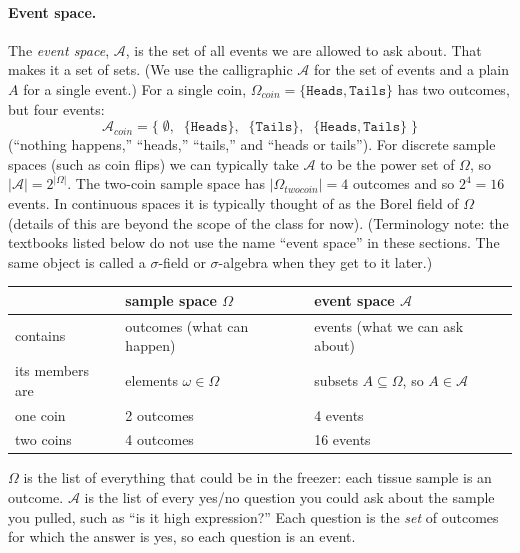 \paragraph{Event space.}
The \emph{event space}, $\mathcal{A}$, is the set of all events we are allowed to ask about.
That makes it a set of sets.
(We use the calligraphic $\mathcal{A}$ for the set of events and a plain $A$ for a single event.)
For a single coin, $\Omega_{coin}=\{\texttt{Heads},\texttt{Tails}\}$ has two outcomes, but four events:
\[\mathcal{A}_{coin}=\Big\{\;\emptyset,\;\;\{\texttt{Heads}\},\;\;\{\texttt{Tails}\},\;\;\{\texttt{Heads},\texttt{Tails}\}\;\Big\}\]
(``nothing happens,'' ``heads,'' ``tails,'' and ``heads or tails''). 
For discrete sample spaces (such as coin flips) we can typically take $\mathcal{A}$ to be the power set of $\Omega$, 
so $|\mathcal{A}|=2^{|\Omega|}$. 
The two-coin sample space has $|\Omega_{twocoin}|=4$ outcomes and so $2^4=16$ events. 
In continuous spaces it is typically thought of as the Borel field of $\Omega$ (details of this are beyond the scope of the class for now). 
(Terminology note: the textbooks listed below do not use the name ``event space'' in these sections. The same object is called a $\sigma$-field or $\sigma$-algebra when they get to it later.)

\begin{center}
\begin{tabular}{|l|l|l|}
\hline
 & sample space $\Omega$ & event space $\mathcal{A}$\\\hline
 contains & outcomes (what can happen) & events (what we can ask about)\\\hline
 its members are & elements $\omega\in\Omega$ & subsets $A\subseteq\Omega$, so $A\in\mathcal{A}$\\\hline
 one coin & 2 outcomes & 4 events\\\hline
 two coins & 4 outcomes & 16 events\\\hline
\end{tabular}
\end{center}

\begin{aside}
$\Omega$ is the list of everything that could be in the freezer: each tissue sample is an outcome. 
$\mathcal{A}$ is the list of every yes/no question you could ask about the sample you pulled, such as ``is it high expression?'' 
Each question is the \emph{set} of outcomes for which the answer is yes, so each question is an event. 
\end{aside}

